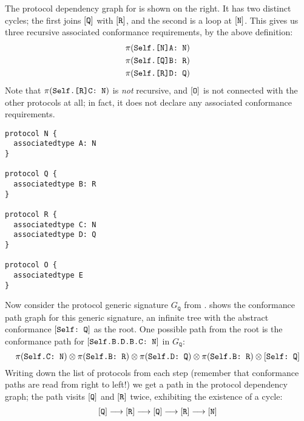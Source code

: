\documentclass[../generics]{subfiles}
\begin{document}
\smallskip

\begin{wrapfigure}[11]{l}{4.5cm}
\end{wrapfigure}
The protocol dependency graph for  is shown on the right. It has two distinct cycles; the first joins $[\texttt{Q}]$ with $[\texttt{R}]$, and the second is a loop at $[\texttt{N}]$. This gives us three recursive associated conformance requirements, by the above definition:
\begin{gather*}
\pi(\texttt{Self.[N]A:~N})\\
\pi(\texttt{Self.[Q]B:~R})\\
\pi(\texttt{Self.[R]D:~Q})
\end{gather*}
Note that $\pi(\texttt{Self.[R]C:~N})$ is \emph{not} recursive, and $[\texttt{O}]$ is not connected with the other protocols at all; in fact, it does not declare any associated conformance requirements.

\smallskip

\begin{listing}\label{protocol dependency graph listing}
\begin{Verbatim}
protocol N {
  associatedtype A: N
}

protocol Q {
  associatedtype B: R
}

protocol R {
  associatedtype C: N
  associatedtype D: Q
}

protocol O {
  associatedtype E
}
\end{Verbatim}
\end{listing}

Now consider the protocol generic signature $G_\texttt{Q}$ from .  shows the conformance path graph for this generic signature, an infinite tree with the abstract conformance $[\texttt{Self:~Q}]$ as the root. One possible path from the root is the conformance path for $[\texttt{Self.B.D.B.C:~N}]$ in $G_\texttt{Q}$:
\[
\pi(\texttt{Self.C:~N}) \otimes \pi(\texttt{Self.B:~R}) \otimes \pi(\texttt{Self.D:~Q}) \otimes \pi(\texttt{Self.B:~R}) \otimes [\texttt{Self:~Q}]
\]
Writing down the list of protocols from each step (remember that conformance paths are read from right to left!) we get a path in the protocol dependency graph; the path visits $[\texttt{Q}]$ and $[\texttt{R}]$ twice, exhibiting the existence of a cycle:
\[[\texttt{Q}]\longrightarrow[\texttt{R}]\longrightarrow[\texttt{Q}]\longrightarrow[\texttt{R}]\longrightarrow[\texttt{N}]\]
\end{document}
